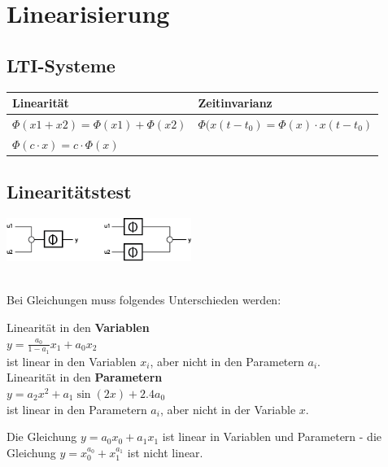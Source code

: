 \section{Linearisierung }
	\begin{minipage}[c]{10cm}
		\subsection{LTI-Systeme }
			\renewcommand{\arraystretch}{1.5}
			\begin{tabular}{|l|l|}
				\hline
				\textbf{Linearität} & \textbf{Zeitinvarianz}\\
				\hline
				$\Phi(x1+x2)=\Phi(x1)+\Phi(x2)$ & $\Phi(x(t-t_0)=\Phi(x)\cdot x(t-t_0)$ \\
				$\Phi(c\cdot x)=c\cdot \Phi(x)$ & \\
				\hline    
			\end{tabular}
			\renewcommand{\arraystretch}{1}
		\end{minipage}
		\begin{minipage}[c]{6cm}
			\subsection{Linearitätstest }
			\includegraphics[width=6cm]{bilder/linearitaetstest}
		\end{minipage} \\
		
	Bei Gleichungen muss folgendes Unterschieden werden: \\
	\begin{multicols}{2}
	Linearität in den \textbf{Variablen} \\
	$y = \frac{a_0}{1-a_1} x_1 + a_0 x_2$ \\
	ist linear in den Variablen $x_i$, aber nicht in den Parametern $a_i$. \\
	
	Linearität in den \textbf{Parametern} \\
	$y = a_2 x^2 + a_1 \sin(2x) + 2.4 a_0$ \\
	ist linear in den Parametern $a_i$, aber nicht in der Variable $x$. \\
	\end{multicols}
	Die Gleichung $y=a_0 x_0+ a_1 x_1$ ist linear in Variablen und Parametern - 
	die Gleichung $y=x_0^{a_0}+x_1^{a_1}$ ist nicht linear.
	  	
